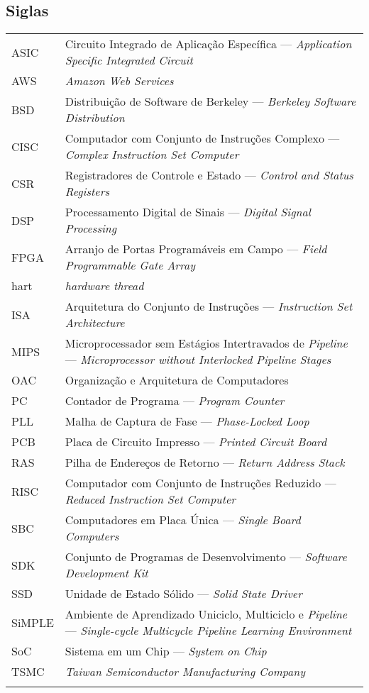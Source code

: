 \subsection*{Siglas}

\begin{tabular}{p{}p{}}
    {ASIC}      & {Circuito Integrado de Aplicação Específica --- \textit{Application Specific Integrated Circuit}}\tabularnewline{}
    {AWS}       & {\textit{Amazon Web Services}} \tabularnewline{}
    {BSD}       & {Distribuição de Software de Berkeley --- \textit{Berkeley Software Distribution}}\tabularnewline{}
    {CISC}      & {Computador com Conjunto de Instruções Complexo --- \textit{Complex Instruction Set Computer}} \tabularnewline{}
    {CSR}       & {Registradores de Controle e Estado --- \textit{Control and Status Registers}} \tabularnewline{}
    {DSP}       & {Processamento Digital de Sinais --- \textit{Digital Signal Processing}} \tabularnewline{}
    {FPGA}      & {Arranjo de Portas Programáveis em Campo --- \textit{Field Programmable Gate Array}} \tabularnewline{}
    {hart}      & {\textit{hardware thread}} \tabularnewline{}
    {ISA}       & {Arquitetura do Conjunto de Instruções --- \textit{Instruction Set Architecture}} \tabularnewline{}
    {MIPS}      & {Microprocessador sem Estágios Intertravados de \textit{Pipeline} --- \textit{Microprocessor without Interlocked Pipeline Stages}} \tabularnewline{}
    {OAC}       & {Organização e Arquitetura de Computadores} \tabularnewline{}
    {PC}        & {Contador de Programa --- \textit{Program Counter}} \tabularnewline{}
    {PLL}       & {Malha de Captura de Fase --- \textit{Phase-Locked Loop}} \tabularnewline{}
    {PCB}       & {Placa de Circuito Impresso --- \textit{Printed Circuit Board}} \tabularnewline{}
    {RAS}       & {Pilha de Endereços de Retorno --- \textit{Return Address Stack}} \tabularnewline{}
    {RISC}      & {Computador com Conjunto de Instruções Reduzido --- \textit{Reduced Instruction Set Computer}} \tabularnewline{}
    {SBC}       & {Computadores em Placa Única --- \textit{Single Board Computers}} \tabularnewline{}
    {SDK}       & {Conjunto de Programas de Desenvolvimento --- \textit{Software Development Kit}} \tabularnewline{}
    {SSD}       & {Unidade de Estado Sólido --- \textit{Solid State Driver}} \tabularnewline{}
    {SiMPLE}    & {Ambiente de Aprendizado Uniciclo, Multiciclo e \textit{Pipeline} --- \textit{Single-cycle Multicycle Pipeline Learning Environment}} \tabularnewline{}
    {SoC}       & {Sistema em um Chip --- \textit{System on Chip}} \tabularnewline{}
    {TSMC}      & {\textit{Taiwan Semiconductor Manufacturing Company}} \tabularnewline{}
\end{tabular}
